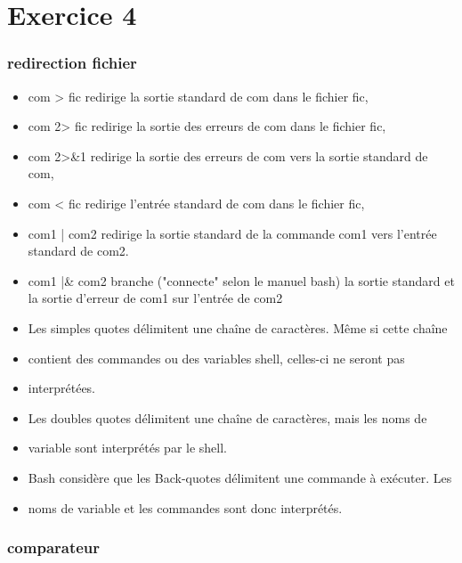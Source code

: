 \documentclass[11pt]{article}
\begin{document}
\section{Exercice 4}
\label{sec:org3b4a438}

\subsubsection{redirection fichier}
\label{sec:orgea26ce4}

\begin{itemize}
\item com > fic redirige la sortie standard de com dans le fichier fic,
\item com 2> fic redirige la sortie des erreurs de com dans le fichier fic,
\item com 2>\&1 redirige la sortie des erreurs de com vers la sortie standard de com,
\item com < fic redirige l'entrée standard de com dans le fichier fic,
\item com1 | com2 redirige la sortie standard de la commande com1 vers l'entrée standard de com2.
\item com1 |\& com2 branche ("connecte" selon le manuel bash) la sortie standard et la sortie d'erreur de com1 sur l'entrée de com2

\item Les simples quotes délimitent une chaîne de caractères. Même si cette chaîne
\item contient des commandes ou des variables shell, celles-ci ne seront pas
\item interprétées.
\item Les doubles quotes délimitent une chaîne de caractères, mais les noms de
\item variable sont interprétés par le shell.
\item Bash considère que les Back-quotes délimitent une commande à exécuter. Les
\item noms de variable et les commandes sont donc interprétés.
\end{itemize}

\subsubsection{comparateur}
\label{sec:orgc63bfa5}
\end{document}
